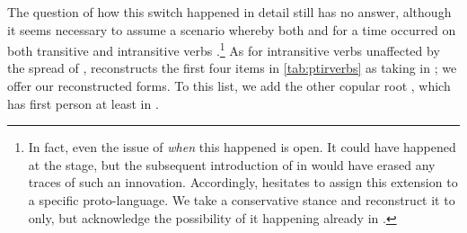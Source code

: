 %
The question of how this switch happened in detail \parencite[107--112]{meira1998proto} still has no answer, although it seems necessary to assume a scenario whereby both  and  for a time occurred on both transitive and intransitive verbs \parencite[112]{meira1998proto}.\footnote{
In fact, even the issue of \emph{when} this happened is open.
It could have happened at the \PTar stage, but the subsequent introduction of  in \carijo {} would have erased any traces of such an innovation.
Accordingly, \textcite{meira1998proto} hesitates to assign this extension to a specific proto-language.
We take a conservative stance and reconstruct it to \PTir only, but acknowledge the possibility of it happening already in \PTar.}
%
As for intransitive verbs unaffected by the spread of , \textcite{meira1998proto} reconstructs the first four items in \cref{tab:ptirverbs} as taking  in \PTar; we offer our reconstructed \PTir forms.
To this list, we add the other copular root  , which has first person  at least in \trio.


